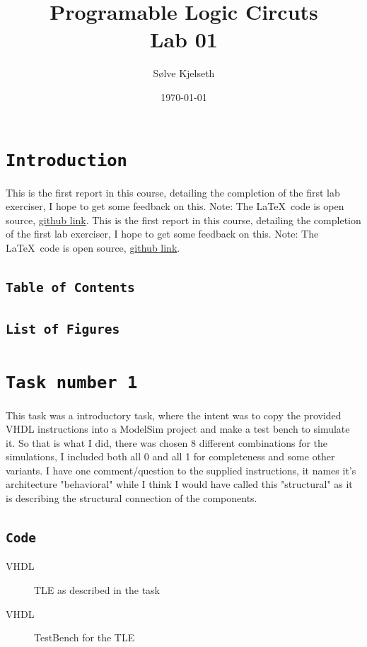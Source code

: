 \documentclass{article}
\title{\fontsize{24}{36}\selectfont Programable Logic Circuts\\ %
Lab 01} %
\author{Sølve Kjelseth} %
\date{\today} %
\makeatletter
\let\oldsection\section
\renewcommand{\section}[1]{%
  \oldsection{\texttt{#1}} %
  \setcounter{subsection}{-1} %
  \setcounter{figure}{-1} %
}
\let\oldsubsection\subsection
\renewcommand{\subsection}[1]{%
  \oldsubsection{\texttt{#1}}%
  \setcounter{subsubsection}{-1}%
}
\renewcommand{\tableofcontents}{%
    \subsection{Table of Contents} %
    \@starttoc{toc}%
}
\renewcommand{\listoffigures}{%
    \subsection{List of Figures} %
    \@starttoc{lof}%
}
\newcommand{\writecode}[3][Example Code]{%
    \begin{codeBlock}{#1}%
    \end{codeBlock}%
    \begin{figure}[h] %
        \centering
        \renewcommand\figurename{Code}
        \caption{#3} %
        \label{Code:#2} %
    \end{figure}
}
\newcommand{\introduction}[1][]{%
    \addtocontents{toc}{\protect\setcounter{tocdepth}{0}} %
    \section{Introduction} %
    \ifx\relax#1\relax %
    \else
        #1 %
    \fi
    \tableofcontents %
    \clearpage
    \listoffigures %
    \addtocontents{toc}{\protect\setcounter{tocdepth}{2}} %
}
\makeatother
\begin{document}
\maketitle %


\introduction[This is the first report in this course, detailing the completion of the first lab exerciser, I hope to get some feedback on this. Note: The \LaTeX\ code is open source, \href{https://github.com/Kjelseth/PLK_lab/tree/d4e9089cbfbc54d71235c1e0b90b5a95e3b57953/Lab01}{github link}.]


\section{Task number 1}
This task was a introductory task, where the intent was to copy the provided VHDL instructions into a ModelSim project and make a test bench to simulate it. So that is what I did, there was chosen 8 different combinations for the simulations, I included both all 0 and all 1 for completeness and some other variants. I have one comment/question to the supplied instructions, it names it's architecture "behavioral" while I think I would have called this "structural" as it is describing the structural connection of the components.

\subsection{Code}
\writecode[VHDL]{Part1_Code.vhd}{TLE as described in the task}
\clearpage
\writecode[VHDL]{Part1_TB.vhd}{TestBench for the TLE}
\clearpage
\end{document}

